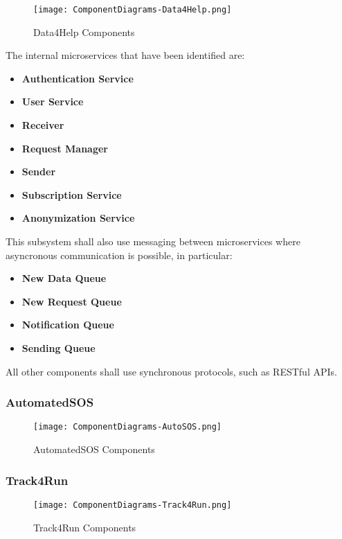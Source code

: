 \FloatBarrier
\begin{figure}[!h]
	\centering
	\texttt{[image: ComponentDiagrams-Data4Help.png]}
	\caption{Data4Help Components}
\end{figure}

\FloatBarrier

The internal microservices that have been identified are:
\begin{itemize}
	\item \textbf{Authentication Service}
	\item \textbf{User Service}
	\item \textbf{Receiver}
	\item \textbf{Request Manager}
	\item \textbf{Sender}
	\item \textbf{Subscription Service}
	\item \textbf{Anonymization Service}
\end{itemize}

This subsystem shall also use messaging between microservices where asyncronous communication is possible, in particular:

\begin{itemize}
	\item \textbf{New Data Queue}
	\item \textbf{New Request Queue}
	\item \textbf{Notification Queue}
	\item \textbf{Sending Queue}
\end{itemize}

All other components shall use synchronous protocols, such as RESTful APIs.

\subsubsection{AutomatedSOS}

\begin{figure}[!h]
	\centering
	\texttt{[image: ComponentDiagrams-AutoSOS.png]}
	\caption{AutomatedSOS Components}
\end{figure}

\FloatBarrier


\subsubsection{Track4Run}

\FloatBarrier
\begin{figure}[!h]
	\centering
	\texttt{[image: ComponentDiagrams-Track4Run.png]}
	\caption{Track4Run Components}
\end{figure}
\FloatBarrier



